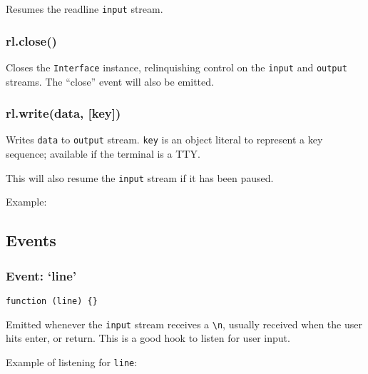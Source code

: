 Resumes the readline \texttt{input} stream.

\subsubsection{rl.close()}\label{rl.close}

Closes the \texttt{Interface} instance, relinquishing control on the
\texttt{input} and \texttt{output} streams. The ``close'' event will
also be emitted.

\subsubsection{rl.write(data, {[}key{]})}\label{rl.writedata-key}

Writes \texttt{data} to \texttt{output} stream. \texttt{key} is an
object literal to represent a key sequence; available if the terminal is
a TTY.

This will also resume the \texttt{input} stream if it has been paused.

Example:

\begin{Shaded}
\begin{Highlighting}[]
\NormalTok{(}\NormalTok{);}
\NormalTok{(}\NormalTok{, \{}\NormalTok{: }\NormalTok{, }\NormalTok{: }\NormalTok{\});}
\end{Highlighting}
\end{Shaded}

\subsection{Events}\label{events}

\subsubsection{Event: `line'}\label{event-line}

\texttt{function (line) \{\}}

Emitted whenever the \texttt{input} stream receives a
\texttt{\textbackslash{}n}, usually received when the user hits enter,
or return. This is a good hook to listen for user input.

Example of listening for \texttt{line}:


